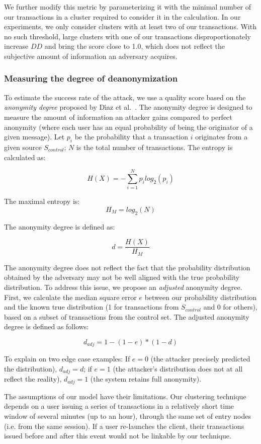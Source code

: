 We further modify this metric by parameterizing it with the minimal number of our transactions in a cluster required to consider it in the calculation.
In our experiments, we only consider clusters with at least two of our transactions.
With no such threshold, large clusters with one of our transactions disproportionately increase $DD$ and bring the score close to 1.0, which does not reflect the subjective amount of information an adversary acquires.

\subsubsection{Measuring the degree of deanonymization}

To estimate the success rate of the attack, we use a quality score based on the \textit{anonymity degree} proposed by D{\'{\i}}az et al.~\cite{Diaz2002}.
The anonymity degree is designed to measure the amount of information an attacker gains compared to perfect anonymity (where each user has an equal probability of being the originator of a given message).
Let $p_i$ be the probability that a transaction $i$ originates from a given source $S_{control}$; $N$ is the total number of transactions.
The entropy is calculated as:

\[
H(X) = -\sum_{i=1}^N p_i log_2(p_i)
\]

The maximal entropy is:
\[
H_M = log_2(N)
\]

The anonymity degree is defined as:

\[
d = \frac{H(X)}{H_M}
\]

The anonymity degree does not reflect the fact that the probability distribution obtained by the adversary may not be well aligned with the true probability distribution.
To address this issue, we propose an \textit{adjusted} anonymity degree.
First, we calculate the median square error $e$ between our probability distribution and the known true distribution (1 for transactions from $S_{control}$ and 0 for others), based on a subset of transactions from the control set.
The adjusted anonymity degree is defined as follows:

\[
d_{adj} = 1 - (1 - e) * (1 - d)
\]

To explain on two edge case examples: If $e = 0$ (the attacker precisely predicted the distribution), $d_{adj} = d$; if $e = 1$ (the attacker's distribution does not at all reflect the reality), $d_{adj} = 1$ (the system retains full anonymity).

The assumptions of our model have their limitations.
Our clustering technique depends on a user issuing a series of transactions in a relatively short time window of several minutes (up to an hour), through the same set of entry nodes (i.e. from the same session).
If a user re-launches the client, their transactions issued before and after this event would not be linkable by our technique.


